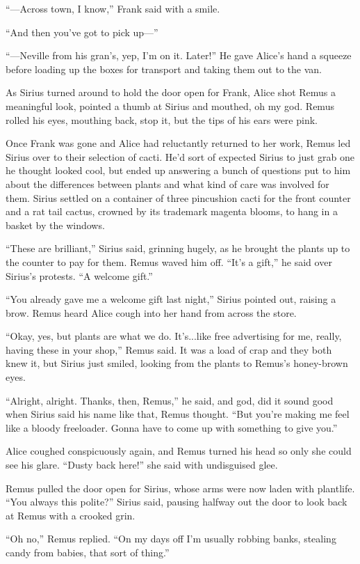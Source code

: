 “—Across town, I know,” Frank said with a smile.

“And then you’ve got to pick up—”

“—Neville from his gran’s, yep, I’m on it. Later!” He gave Alice’s hand a squeeze before loading up the boxes for transport and taking them out to the van.

As Sirius turned around to hold the door open for Frank, Alice shot Remus a meaningful look, pointed a thumb at Sirius and mouthed, oh my god. Remus rolled his eyes, mouthing back, stop it, but the tips of his ears were pink.

Once Frank was gone and Alice had reluctantly returned to her work, Remus led Sirius over to their selection of cacti. He’d sort of expected Sirius to just grab one he thought looked cool, but ended up answering a bunch of questions put to him about the differences between plants and what kind of care was involved for them. Sirius settled on a container of three pincushion cacti for the front counter and a rat tail cactus, crowned by its trademark magenta blooms, to hang in a basket by the windows.

“These are brilliant,” Sirius said, grinning hugely, as he brought the plants up to the counter to pay for them. Remus waved him off. “It’s a gift,” he said over Sirius’s protests. “A welcome gift.”

“You already gave me a welcome gift last night,” Sirius pointed out, raising a brow. Remus heard Alice cough into her hand from across the store.

“Okay, yes, but plants are what we do. It’s...like free advertising for me, really, having these in your shop,” Remus said. It was a load of crap and they both knew it, but Sirius just smiled, looking from the plants to Remus’s honey-brown eyes.

“Alright, alright. Thanks, then, Remus,” he said, and god, did it sound good when Sirius said his name like that, Remus thought. “But you’re making me feel like a bloody freeloader. Gonna have to come up with something to give you.”

Alice coughed conspicuously again, and Remus turned his head so only she could see his glare. “Dusty back here!” she said with undisguised glee.

Remus pulled the door open for Sirius, whose arms were now laden with plantlife. “You always this polite?” Sirius said, pausing halfway out the door to look back at Remus with a crooked grin.

“Oh no,” Remus replied. “On my days off I’m usually robbing banks, stealing candy from babies, that sort of thing.”

